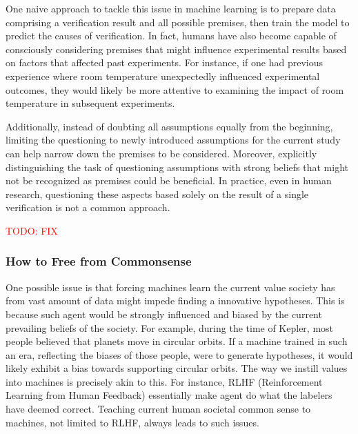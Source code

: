 \documentclass{book}
\begin{document}
One naive approach to tackle this issue in machine learning is to prepare data comprising a verification result and all possible premises, then train the model to predict the causes of verification. In fact, humans have also become capable of consciously considering premises that might influence experimental results based on factors that affected past experiments. For instance, if one had previous experience where room temperature unexpectedly influenced experimental outcomes, they would likely be more attentive to examining the impact of room temperature in subsequent experiments.

Additionally, instead of doubting all assumptions equally from the beginning, limiting the questioning to newly introduced assumptions for the current study can help narrow down the premises to be considered. Moreover, explicitly distinguishing the task of questioning assumptions with strong beliefs that might not be recognized as premises could be beneficial. In practice, even in human research, questioning these aspects based solely on the result of a single verification is not a common approach.

\textcolor{red}{TODO: FIX}

\subsubsection{How to Free from Commonsense}

One possible issue is that forcing machines learn the current value society has from vast amount of data might impede finding a innovative hypotheses. This is because such agent would be strongly influenced and biased by the current prevailing beliefs of the society. For example, during the time of Kepler, most people believed that planets move in circular orbits. If a machine trained in such an era, reflecting the biases of those people, were to generate hypotheses, it would likely exhibit a bias towards supporting circular orbits. The way we instill values into machines is precisely akin to this. For instance, RLHF (Reinforcement Learning from Human Feedback) essentially make agent do what the labelers have deemed correct. Teaching current human societal common sense to machines, not limited to RLHF, always leads to such issues.
 
\end{document}
